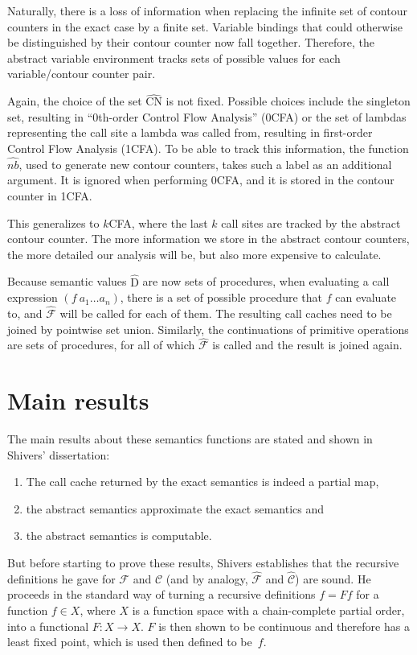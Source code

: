 \documentclass[a4paper,halfparskip,DIV=10,11pt]{scrbook}
\newcommand{\C}{\mathcal C}
\newcommand{\F}{\mathcal F}
\newcommand{\aC}{\widehat{\mathcal C}}
\newcommand{\aF}{\widehat{\mathcal F}}
\begin{document}
Naturally, there is a loss of information when replacing the infinite set of contour counters in the exact case by a finite set. Variable bindings that could otherwise be distinguished by their contour counter now fall together. Therefore, the abstract variable environment tracks sets of possible values for each variable/contour counter pair.

Again, the choice of the set $\widehat{\text{CN}}$ is not fixed. Possible choices include the singleton set, resulting in “0th-order Control Flow Analysis” (0CFA) or the set of lambdas representing the call site a lambda was called from, resulting in first-order Control Flow Analysis (1CFA). To be able to track this information, the function $\widehat{nb}$, used to generate new contour counters, takes such a label as an additional argument. It is ignored when performing 0CFA, and it is stored in the contour counter in 1CFA.

This generalizes to $k$CFA, where the last $k$ call sites are tracked by the abstract contour counter. The more information we store in the abstract contour counters, the more detailed our analysis will be, but also more expensive to calculate.

Because semantic values $\widehat{\text{D}}$ are now sets of procedures, when evaluating a call expression $(f\ a_1\ldots a_n)$, there is a set of possible procedure that $f$ can evaluate to, and $\aF$ will be called for each of them. The resulting call caches need to be joined by pointwise set union. Similarly, the continuations of primitive operations are sets of procedures, for all of which $\aF$ is called and the result is joined again.

\section{Main results}

The main results about these semantics functions are stated and shown in Shivers’ dissertation:
\begin{enumerate}
\item The call cache returned by the exact semantics is indeed a partial map,
\item the abstract semantics approximate the exact semantics and
\item the abstract semantics is computable.
\end{enumerate}

But before starting to prove these results, Shivers establishes that the recursive definitions he gave for $\F$ and $\C$ (and by analogy, $\aF$ and $\aC$) are sound. He proceeds in the standard way of turning a recursive definitions $f = F f$ for a function $f\in X$, where $X$ is a function space with a chain-complete partial order, into a functional $F\colon X \to X$. $F$ is then shown to be continuous and therefore has a least fixed point, which is used then defined to be~$f$.
  
\end{document}
